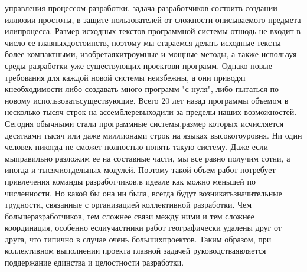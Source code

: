 \documentclass[11pt]{article}
\begin{document}
 управления процессом разработки.  задача разработчиков состоит\linebreak в создании иллюзии простоты, в защите пользователей от сложности описываемого предмета или\linebreak процесса. Размер исходных текстов программной системы отнюдь не входит в число ее главных\linebreak достоинств, поэтому мы стараемся делать исходные тексты более компактными, изобретая\linebreak хитроумные и мощные методы, а также используя среды разработки уже существующих проектов\linebreak и программ. Однако новые требования для каждой новой системы неизбежны, а они приводят к\linebreak необходимости либо создавать много программ "с нуля", либо пытаться по-новому использовать\linebreak существующие. Всего 20 лет назад программы объемом в несколько тысяч строк на ассемблере\linebreak выходили за пределы наших возможностей. Сегодня обычными стали программные системы,\linebreak размер которых исчисляется десятками тысяч или даже миллионами строк на языках высокого\linebreak уровня. Ни один человек никогда не сможет полностью понять такую систему. Даже если мы\linebreak правильно разложим ее на составные части, мы все равно получим сотни, а иногда и тысячи\linebreak отдельных модулей. Поэтому такой объем работ потребует привлечения команды разработчиков,\linebreak в идеале как можно меньшей по численности. Но какой бы она ни была, всегда будут возникать\linebreak значительные трудности, связанные с организацией коллективной разработки. Чем больше\linebreak разработчиков, тем сложнее связи между ними и тем сложнее координация, особенно если\linebreak участники работ географически удалены друг от друга, что типично в случае очень больших\linebreak проектов. Таким образом, при коллективном выполнении проекта главной задачей руководства\linebreak является поддержание единства и целостности разработки.\linebreak \bigskip
\end{document}
